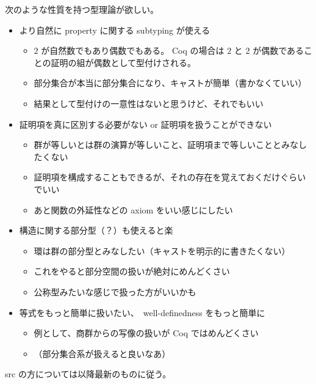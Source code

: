 次のような性質を持つ型理論が欲しい。

\begin{itemize}
  \item より自然に property に関する subtyping が使える
  \begin{itemize}
    \item \(2\) が自然数でもあり偶数でもある。
    Coq の場合は \(2\) と \(2\) が偶数であることの証明の組が偶数として型付けされる。
    \item 部分集合が本当に部分集合になり、キャストが簡単（書かなくていい）
    \item 結果として型付けの一意性はないと思うけど、それでもいい
  \end{itemize}

  \item 証明項を真に区別する必要がない or 証明項を扱うことができない
  \begin{itemize}
    \item 群が等しいとは群の演算が等しいこと、証明項まで等しいこととみなしたくない
    \item 証明項を構成することもできるが、それの存在を覚えておくだけぐらいでいい
    \item あと関数の外延性などの axiom をいい感じにしたい
  \end{itemize}

  \item 構造に関する部分型（？）も使えると楽
  \begin{itemize}
    \item 環は群の部分型とみなしたい（キャストを明示的に書きたくない）
    \item これをやると部分空間の扱いが絶対にめんどくさい
    \item 公称型みたいな感じで扱った方がいいかも
  \end{itemize}

  \item 等式をもっと簡単に扱いたい、　well-definedness をもっと簡単に
  \begin{itemize}
    \item 例として、商群からの写像の扱いが Coq ではめんどくさい
    \item （部分集合系が扱えると良いなあ）
  \end{itemize}

\end{itemize}

src の方については以降最新のものに従う。